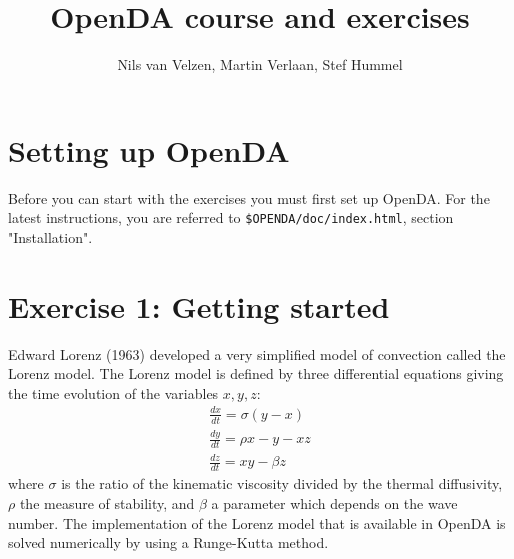 \documentclass[a4paper,10pt]{article}
\title{OpenDA course and exercises}
\author{Nils van Velzen, Martin Verlaan, Stef Hummel}
\begin{document}

\maketitle



\section*{Setting up OpenDA}
Before you can start with the exercises you must first set up OpenDA. For the
latest instructions, you are referred to {\tt \$OPENDA/doc/index.html}, 
section "Installation".

\section{Exercise 1: Getting started}

Edward Lorenz (1963) developed
a very simplified model of convection called the Lorenz model. The Lorenz model
is defined by three differential equations giving the time evolution of the
variables $x,y,z$:
\begin{eqnarray}
   \frac{dx}{dt}=\sigma(y-x) \\
   \frac{dy}{dt}=\rho x - y -x z \\
   \frac{dz}{dt}=x y - \beta z
\end{eqnarray}
where $\sigma$ is the ratio of the kinematic viscosity divided by the thermal
diffusivity, $\rho$ the measure of stability, and $\beta$ a parameter which
depends on the wave number.
The implementation of the Lorenz model that is available in OpenDA is solved numerically by using a Runge-Kutta method.
\end{document}
